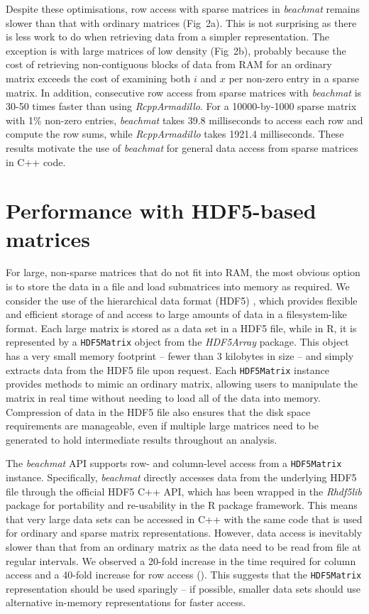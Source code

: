 \documentclass{article}
\newcommand{\beachmat}{\textit{beachmat}}
\newcommand{\code}[1]{\texttt{#1}}
\begin{document}
Despite these optimisations, row access with sparse matrices in \beachmat{} remains slower than that with ordinary matrices (Fig~2a).
This is not surprising as there is less work to do when retrieving data from a simpler representation.
The exception is with large matrices of low density (Fig~2b), probably because the cost of retrieving non-contiguous blocks of data from RAM for an ordinary matrix exceeds the cost of examining both $i$ and $x$ per non-zero entry in a sparse matrix.
In addition, consecutive row access from sparse matrices with \beachmat{} is 30-50 times faster than using \textit{RcppArmadillo}.
For a 10000-by-1000 sparse matrix with 1\% non-zero entries, \beachmat{} takes 39.8 milliseconds to access each row and compute the row sums, while \textit{RcppArmadillo} takes 1921.4 milliseconds.
These results motivate the use of \beachmat{} for general data access from sparse matrices in C++ code.

\section{Performance with HDF5-based matrices}
For large, non-sparse matrices that do not fit into RAM, the most obvious option is to store the data in a file and load submatrices into memory as required.
We consider the use of the hierarchical data format (HDF5) \cite{hdf5}, which provides flexible and efficient storage of and access to large amounts of data in a filesystem-like format.
Each large matrix is stored as a data set in a HDF5 file, while in R, it is represented by a \code{HDF5Matrix} object from the \textit{HDF5Array} package.
This object has a very small memory footprint -- fewer than 3 kilobytes in size -- and simply extracts data from the HDF5 file upon request.
Each \code{HDF5Matrix} instance provides methods to mimic an ordinary matrix, allowing users to manipulate the matrix in real time without needing to load all of the data into memory.
Compression of data in the HDF5 file also ensures that the disk space requirements are manageable, even if multiple large matrices need to be generated to hold intermediate results throughout an analysis.

The \beachmat{} API supports row- and column-level access from a \code{HDF5Matrix} instance.
Specifically, \beachmat{} directly accesses data from the underlying HDF5 file through the official HDF5 C++ API, which has been wrapped in the \textit{Rhdf5lib} package for portability and re-usability in the R package framework.
This means that very large data sets can be accessed in C++ with the same code that is used for ordinary and sparse matrix representations.
However, data access is inevitably slower than that from an ordinary matrix as the data need to be read from file at regular intervals.
We observed a 20-fold increase in the time required for column access and a 40-fold increase for row access (\suppfighdfspeed{}).
This suggests that the \code{HDF5Matrix} representation should be used sparingly -- if possible, smaller data sets should use alternative in-memory representations for faster access.
\end{document}
